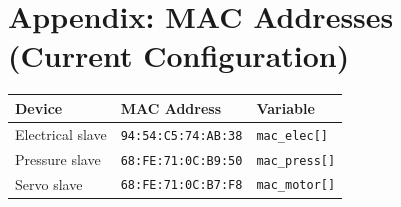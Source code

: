 \documentclass[11pt,a4paper]{article}
\begin{document}
\section{Appendix: MAC Addresses (Current Configuration)}

\begin{center}
\begin{tabular}{lll}
\toprule
\textbf{Device} & \textbf{MAC Address} & \textbf{Variable} \\
\midrule
Electrical slave & \texttt{94:54:C5:74:AB:38} & \texttt{mac\_elec[]} \\
Pressure slave   & \texttt{68:FE:71:0C:B9:50} & \texttt{mac\_press[]} \\
Servo slave      & \texttt{68:FE:71:0C:B7:F8} & \texttt{mac\_motor[]} \\
\bottomrule
\end{tabular}
\end{center}
\end{document}
